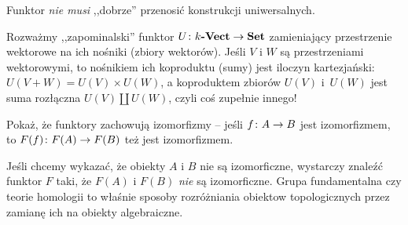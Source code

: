 

\begin{remk}
  Funktor \emph{nie musi} ,,dobrze'' przenosić konstrukcji uniwersalnych.

  Rozważmy ,,zapominalski'' funktor $U\colon k\textbf{-Vect}\to \textbf{Set}$ zamieniający przestrzenie wektorowe na ich nośniki (zbiory wektorów). Jeśli $V$ i $W$ są przestrzeniami wektorowymi, to nośnikiem ich koproduktu (sumy) jest iloczyn kartezjański: $U(V+W) = U(V)\times U(W)$, a koproduktem zbiorów $U(V)$ i~$U(W)$ jest suma rozłączna $U(V)\coprod U(W)$, czyli coś zupełnie innego!
\end{remk}

\begin{exc}
  \label{exc:izo_preserved}
  Pokaż, że funktory zachowują izomorfizmy -- jeśli $f\colon A\to B$ jest izomorfizmem, to $F(f)\colon F(A)\to F(B)$ też jest izomorfizmem.
\end{exc}

\begin{remk}
  Jeśli chcemy wykazać, że obiekty $A$ i $B$ nie są izomorficzne, wystarczy znaleźć funktor $F$ taki, że $F(A)$ i $F(B)$ \emph{nie} są izomorficzne. Grupa fundamentalna czy teorie homologii to właśnie sposoby rozróżniania obiektow topologicznych przez zamianę ich na obiekty algebraiczne.
\end{remk}

